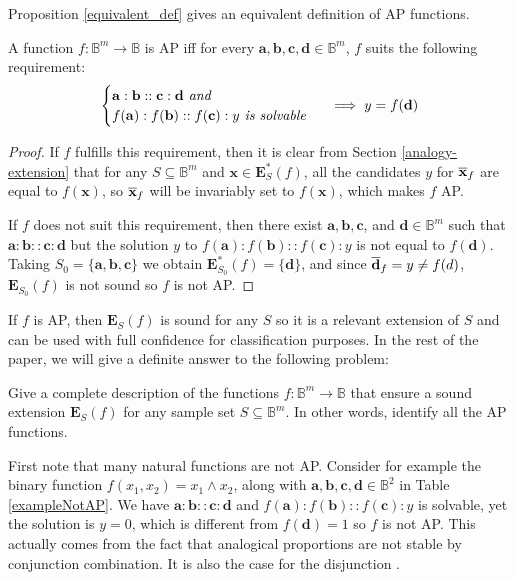 \noindent
Proposition \ref{equivalent_def} gives an equivalent definition of AP
functions.

\begin{proposition}\label{equivalent_def}
  A function $f \colon \mathbb{B}^m \to \mathbb{B}$ is AP iff for every
  $\mathbf{a}, \mathbf{b}, \mathbf{c}, \mathbf{d} \in \mathbb{B}^m$, $f$ suits
  the following requirement:
  $$
  \begin{cases}
    \mathbf{a} :  \mathbf{b} ::  \mathbf{c} :  \mathbf{d} \emph{ and }\\
  f(\mathbf{a}) :  f(\mathbf{b}) ::  f(\mathbf{c}) :  y \emph{ is solvable  }
  \end{cases}
  \implies y = f(\mathbf{d})
  $$
\end{proposition}
\begin{proof}
  If $f$ fulfills  this requirement, then it is clear from Section
  \ref{analogy-extension} that for any $S \subseteq
  \mathbb{B}^m$ and $\mathbf{x} \in \mathbf{E}^*_S(f)$, all the candidates $y$
  for $\overline{\mathbf{x}}_f$ are equal to $f(\mathbf{x})$, so
  $\overline{\mathbf{x}}_f$ will be invariably set to $f(\mathbf{x})$, which makes
  $f$ AP.

If $f$ does not suit this requirement, then there exist $\mathbf{a},
  \mathbf{b}, \mathbf{c}$, and $\mathbf{d} \in \mathbb{B}^m$ such that
  $\mathbf{a} : \mathbf{b} :: \mathbf{c} : \mathbf{d}$ but the solution $y$ to
  $f(\mathbf{a}) : f(\mathbf{b}) :: f(\mathbf{c}) : y$ is not equal to
  $f(\mathbf{d})$. Taking $S_0 = \{\mathbf{a}, \mathbf{b}, \mathbf{c}\}$ we
  obtain $\mathbf{E}^*_{S_0}(f) = \{\mathbf{d}\}$, and since $\overline{\mathbf{d}}_f = y
  \neq f(d)$, $\mathbf{E}_{S_0}(f)$ is not sound so $f$ is not AP.
\end{proof}

If $f$ is AP, then $\mathbf{E}_S(f)$ is sound for any $S$ so it is a relevant
extension of $S$ and can be used with full confidence for classification
purposes. In the rest of the paper, we will give a definite answer to the
following problem:

\begin{problem}\label{prob}
  Give a complete description of the functions $f\colon \mathbb{B}^m\to
  \mathbb{B}$ that ensure a sound extension $\mathbf{E}_S(f)$ for any sample
  set $S\subseteq \mathbb{B}^m$. In other words, identify all the AP
  functions.
\end{problem}

First note that many natural functions are not AP. Consider for example the
binary function $f(x_1,x_2)= x_1 \wedge x_2$, along with $\mathbf{a},
\mathbf{b}, \mathbf{c}, \mathbf{d} \in \mathbb{B}^2$ in Table
\ref{exampleNotAP}.  We have $\mathbf{a} : \mathbf{b} :: \mathbf{c} :
\mathbf{d}$ and $f(\mathbf{a}) : f(\mathbf{b}) :: f(\mathbf{c}) : y$ is
solvable, yet the solution is $y=0$, which  is different from $f(\mathbf{d})=1$
so $f$ is not AP. This actually comes from the fact that analogical proportions
are not stable by conjunction combination. It is also the case for the
disjunction \cite{PraRicLU2013}.

